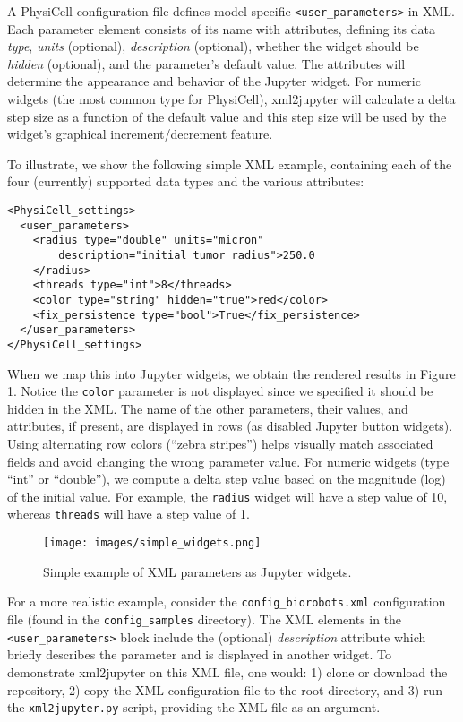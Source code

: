 \documentclass[10pt,letterpaper]{article}
\begin{document}
A PhysiCell configuration file defines model-specific
\texttt{\textless{}user\_parameters\textgreater{}} in XML. Each
parameter element consists of its name with attributes, defining its
data \emph{type}, \emph{units} (optional), \emph{description}
(optional), whether the widget should be \emph{hidden} (optional), and
the parameter's default value. The attributes will determine the
appearance and behavior of the Jupyter widget. For numeric widgets (the
most common type for PhysiCell), xml2jupyter will calculate a delta step
size as a function of the default value and this step size will be used
by the widget's graphical increment/decrement feature.

To illustrate, we show the following simple XML example, containing each
of the four (currently) supported data types and the various attributes:

\begin{verbatim}
<PhysiCell_settings>
  <user_parameters>
    <radius type="double" units="micron"
        description="initial tumor radius">250.0
    </radius>
    <threads type="int">8</threads>
    <color type="string" hidden="true">red</color>
    <fix_persistence type="bool">True</fix_persistence>
  </user_parameters>
</PhysiCell_settings>
\end{verbatim}

When we map this into Jupyter widgets, we obtain the rendered results in
Figure 1. Notice the \texttt{color} parameter is not displayed since we
specified it should be hidden in the XML. The name of the other
parameters, their values, and attributes, if present, are displayed in
rows (as disabled Jupyter button widgets). Using alternating row colors
(``zebra stripes'') helps visually match associated fields and avoid
changing the wrong parameter value. For numeric widgets (type ``int'' or
``double''), we compute a delta step value based on the magnitude (log)
of the initial value. For example, the \texttt{radius} widget will have
a step value of 10, whereas \texttt{threads} will have a step value of
1.

\begin{figure}[H]
\centering
\texttt{[image: images/simple\_widgets.png]}
\captionsetup{justification=centering}
\caption{Simple example of XML parameters as Jupyter widgets.}
\end{figure}

For a more realistic example, consider the
\texttt{config\_biorobots.xml} configuration file (found in the
\texttt{config\_samples} directory). The XML elements in the
\texttt{\textless{}user\_parameters\textgreater{}} block include the
(optional) \emph{description} attribute which briefly describes the
parameter and is displayed in another widget. To demonstrate xml2jupyter
on this XML file, one would: 1) clone or download the repository, 2)
copy the XML configuration file to the root directory, and 3) run the
\texttt{xml2jupyter.py} script, providing the XML file as an argument.
\end{document}
